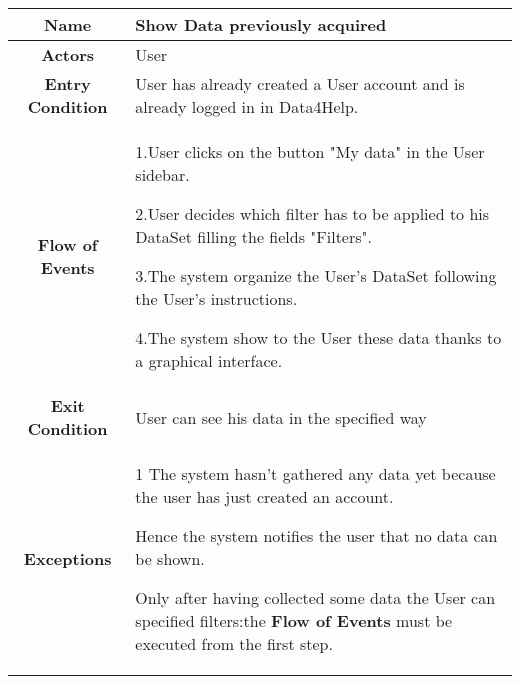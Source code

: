       \begin{table}[h!]
        \centering
        \begin{tabularx}{\linewidth}{|c|X|}
          \hline

          \textbf{Name} & Show Data previously acquired\\
        	\hline

        	\textbf{Actors} & User\\
        	\hline

        	\textbf{Entry Condition} & User has already created a User account and is already logged in in Data4Help.\\
        	\hline

        	\textbf{Flow of Events} &
        					1.User clicks on the button "My data" in the User sidebar.

        					2.User decides which filter has to be applied to his DataSet filling the fields "Filters".

        					3.The system organize the User's DataSet following the User's instructions.

        					4.The system show to the User these data thanks to a graphical interface. \\
        	\hline

        	\textbf{Exit Condition} & User can see his data in the specified way\\

        	\hline

        	\textbf{Exceptions} & 1 The system hasn't gathered any data yet because the user has just created an account.

        				Hence the system notifies the user that no data can be shown.

        				Only after having collected some data the User can specified filters:the \textbf{Flow of Events} must 					be executed from the first step.\\

          \hline

     
   \end{tabularx}
     
 \end{table}



